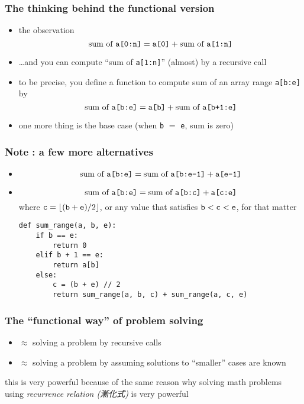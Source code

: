\documentclass[12pt,dvipdfmx]{beamer}
\newcommand{\ao}[1]{{\color{blue}#1}}
\begin{document}
\begin{frame}[fragile]
  \frametitle{The thinking behind the functional version}
  \begin{itemize}
  \item the observation
    \[ \mbox{sum of {\tt a[0:n]}} = \mbox{\tt a[0]} + \mbox{sum of {\tt a[1:n]}} \]
  \item \ldots and you can compute ``sum of {\tt a[1:n]}'' (almost) by a recursive call
  \item to be precise, you define a function to compute sum of an array range {\tt a[b:e]} by
    \[ \mbox{sum of {\tt a[b:e]}} = \mbox{\tt a[b]} + \mbox{sum of {\tt a[b+1:e]}} \]
  \item one more thing is the base case (when {\tt b} $=$ {\tt e}, sum is zero)
  \end{itemize}
\end{frame}

\begin{frame}[fragile]
  \frametitle{Note : a few more alternatives}
  \begin{itemize}
  \item 
    \[ \mbox{sum of {\tt a[b:e]}} = \mbox{sum of {\tt a[b:e-1]}} + \mbox{\tt a[e-1]} \]
  \item 
    \[ \mbox{sum of {\tt a[b:e]}} = \mbox{sum of {\tt a[b:c]}} + \mbox{\tt a[c:e]} \]
    where ${\tt c} = \left\lfloor ({\tt b} + {\tt e}) / 2 \right\rfloor$,
    or any value that satisfies ${\tt b} < {\tt c} < {\tt e}$, for that matter

\begin{lstlisting}
def sum_range(a, b, e):
    if b == e:
        return 0
    elif b + 1 == e:
        return a[b]
    else:
        c = (b + e) // 2
        return sum_range(a, b, c) + sum_range(a, c, e)
\end{lstlisting}
  \end{itemize}
\end{frame}

\begin{frame}
  \frametitle{The ``functional way'' of problem solving}
  \begin{itemize}
  \item $\approx$ solving a problem by recursive calls
  \item $\approx$ solving a problem by assuming solutions to ``smaller'' cases are known
  \end{itemize}

  this is very powerful because of the same reason why solving math problems
  using \ao{\it recurrence relation (漸化式)} is very powerful
\end{frame}
\end{document}
